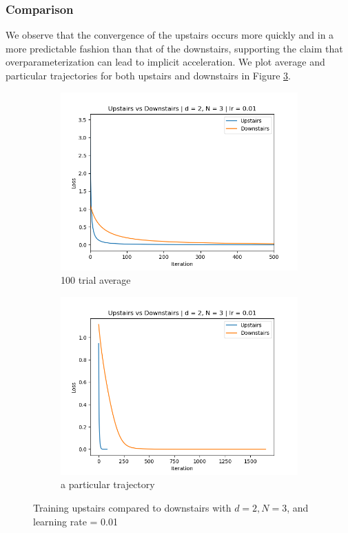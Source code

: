 \documentclass[11pt]{article}
\begin{document}
\subsubsection{Comparison}
We observe that the convergence of the upstairs occurs more quickly and in a more predictable fashion than that of the downstairs, supporting the claim that overparameterization can lead to implicit acceleration. We plot average and particular trajectories for both upstairs and downstairs in Figure \ref{fig:upstairs_downstairs}.
\begin{figure}[ht]
    \begin{subfigure}{0.5\textwidth}
        \centering
        \includegraphics[width=\textwidth]{images/upstairs_downstairs_avg_lr1e-2.png}
        \caption{100 trial average}
        \label{fig:upstairs_downstairs_avg}
    \end{subfigure}
    \begin{subfigure}{0.5\textwidth}
        \centering
        \includegraphics[width=\textwidth]{images/upstairs_downstairs_1_lr1e-2.png}
        \caption{a particular trajectory}
        \label{fig:upstairs_downstairs_1}
    \end{subfigure}
    \caption{Training upstairs compared to downstairs with $d = 2, N = 3$, and learning rate = 0.01}
    \label{fig:upstairs_downstairs}
\end{figure}


\pagebreak



\end{document}
